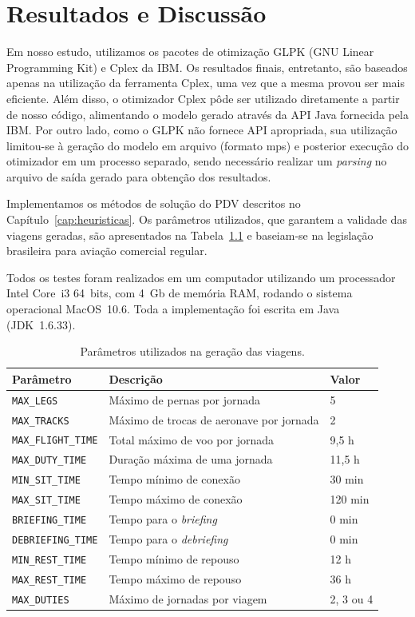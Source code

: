 \zerar
\chapter{Resultados e Discussão}
\label{cap:resultados}

Em nosso estudo, utilizamos os pacotes de otimização GLPK (GNU Linear Programming Kit) e Cplex da
IBM. Os resultados finais, entretanto, são baseados apenas na utilização da ferramenta Cplex, uma
vez que a mesma provou ser mais eficiente. Além disso, o otimizador Cplex pôde ser utilizado
diretamente a partir de nosso código, alimentando o modelo gerado através da API Java fornecida pela
IBM. Por outro lado, como o GLPK não fornece API apropriada, sua utilização limitou-se à geração do
modelo em arquivo (formato mps) e posterior execução do otimizador em um processo separado, sendo
necessário realizar um {\it parsing} no arquivo de saída gerado para obtenção dos resultados.

Implementamos os métodos de solução do PDV descritos no Capítulo~\ref{cap:heuristicas}. Os 
parâmetros utilizados, que garantem a validade das viagens geradas, são apresentados na
Tabela~\ref{tab:parametros} e baseiam-se na legislação brasileira para aviação comercial regular.

Todos os testes foram realizados em um computador utilizando um processador Intel Core~i3 64~bits, 
com 4~Gb de memória RAM, rodando o sistema operacional MacOS~10.6. Toda a implementação foi escrita 
em Java (JDK~1.6.33).

\begin{table}
	\begin{center}
		\begin{tabular}{|l|l|l|}
			\hline 
			\bf Parâmetro & \bf Descrição & \bf Valor \\
			\hline \hline 
			\verb|MAX_LEGS| & Máximo de pernas por jornada & 5 \\ \hline
			\verb|MAX_TRACKS| & Máximo de trocas de aeronave por jornada & 2 \\ \hline
			\verb|MAX_FLIGHT_TIME| & Total máximo de voo por jornada & 9,5 h \\ \hline
			\verb|MAX_DUTY_TIME| & Duração máxima de uma jornada & 11,5 h \\ \hline
			\verb|MIN_SIT_TIME| & Tempo mínimo de conexão & 30 min \\ \hline
			\verb|MAX_SIT_TIME| & Tempo máximo de conexão & 120 min \\ \hline
			\verb|BRIEFING_TIME| & Tempo para o {\it briefing} & 0 min \\ \hline
			\verb|DEBRIEFING_TIME| & Tempo para o {\it debriefing} & 0 min \\ \hline
			\verb|MIN_REST_TIME| & Tempo mínimo de repouso & 12 h \\ \hline
			\verb|MAX_REST_TIME| & Tempo máximo de repouso & 36 h \\ \hline
			\verb|MAX_DUTIES| & Máximo de jornadas por viagem & 2, 3 ou 4 \\ \hline
			\end{tabular} 
			\caption{Parâmetros utilizados na geração das viagens.}
			\label{tab:parametros}
	\end{center}
\end{table}

